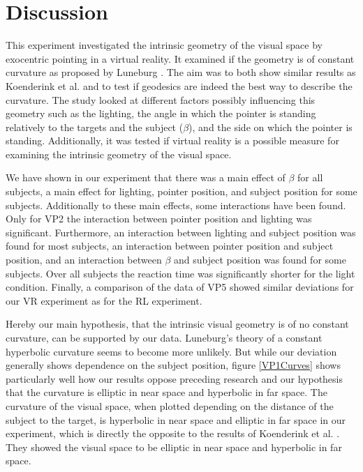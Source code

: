 
\chapter{Discussion}
\label{Discussion}

This experiment investigated the intrinsic geometry of the visual space by exocentric pointing in a virtual reality. It examined if the geometry is of constant curvature as proposed by Luneburg \citeyear{Luneburg.1947}. The aim was to both show similar results as Koenderink et al. \citeyear{Koenderink.2000} and to test if geodesics are indeed the best way to describe the curvature. The study looked at different factors possibly influencing this geometry such as the lighting, the angle in which the pointer is standing relatively to the targets and the subject ($\beta$), and the side on which the pointer is standing. Additionally, it was tested if virtual reality is a possible measure for examining the intrinsic geometry of the visual space. 

We have shown in our experiment that there was a main effect of $\beta$ for all subjects, a main effect for lighting, pointer position, and subject position for some subjects. Additionally to these main effects, some interactions have been found. Only for VP2 the interaction between pointer position and lighting was significant. Furthermore, an interaction between lighting and subject position was found for most subjects, an interaction between pointer position and subject position, and an interaction between $\beta$ and subject position was found for some subjects. 
Over all subjects %
the reaction time was significantly shorter for the light condition.
Finally, a comparison of the data of VP5 showed similar deviations for our VR experiment as for the RL experiment. 

Hereby our main hypothesis, that the intrinsic visual geometry is of no constant curvature, can be supported by our data. Luneburg's theory of a constant hyperbolic curvature \citeyear{Luneburg.1947} seems to become more unlikely. But while our deviation generally shows dependence on the subject position, figure \ref{VP1Curves} shows particularly well how our results oppose preceding research and our hypothesis that the curvature is elliptic in near space and hyperbolic in far space.
The curvature of the visual space, when plotted depending on the distance of the subject to the target, is hyperbolic in near space and elliptic in far space in our experiment, which is directly the opposite to the results of Koenderink et al. \citeyear{Koenderink.2000}. They showed the visual space to be elliptic in near space and hyperbolic in far space. 

